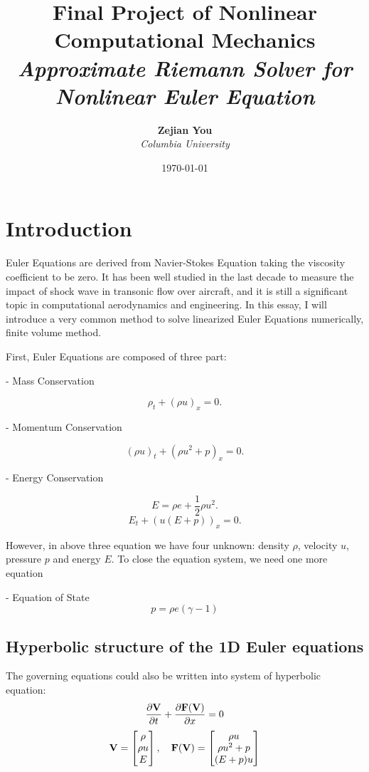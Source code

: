 \documentclass[11pt]{diazessay} %
\title{\textbf{Final Project of Nonlinear Computational Mechanics} \\ {\Large\itshape Approximate Riemann Solver for Nonlinear Euler Equation}} %
\author{\textbf{Zejian You} \\ \textit{Columbia University}} %
\date{\today} %
\begin{document}
\maketitle %



\section{Introduction}

Euler Equations are derived from Navier-Stokes Equation taking the viscosity coefficient to be zero. It has been well studied in the last decade to measure the impact of shock wave in transonic flow over aircraft, and it is still a significant topic in computational aerodynamics and engineering. In this essay, I will introduce a very common method to solve linearized Euler Equations numerically, finite volume method. 

First, Euler Equations are composed of three part:

- Mass Conservation
  
$$\rho_t + (\rho u)_x = 0.$$

- Momentum Conservation

$$(\rho u)_t + (\rho u^2 + p)_x = 0.$$

- Energy Conservation
  
$$E = \rho e + \frac{1}{2}\rho u^2.$$
$$E_t + (u(E+p))_x = 0.$$

However, in above three equation we have four unknown: density $\rho$, velocity $u$, pressure $p$ and energy $E$. To close the equation system, we need one more equation

- Equation of State
$$
p = \rho e(\gamma -1)
$$

\subsection{Hyperbolic structure of the 1D Euler equations}
The governing equations could also be written into system of hyperbolic equation:
$$
    \frac{\partial \bf{V}}{\partial t} + \frac{\partial \bf{F}(\bf{V})}{\partial x} =0 
$$
$$
    \bf{V} = \begin{bmatrix}
        \rho \\ \rho u\\ E
    \end{bmatrix}, \quad \bf{F}(\bf{V})=\begin{bmatrix}
        \rho u \\\rho u^2 + p\\(E + p) u
    \end{bmatrix}
$$
\end{document}
